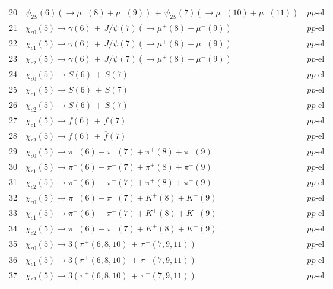 \documentclass{article}
\begin{document}
\begin{center}
\begin{tabular}{|c|l|l|}
20 & $\psi_{2S}(6)(\to \mu^+(8)+\mu^-(9))\,+\,\psi_{2S}(7)(\to \mu^+(10)+\mu^-(11))$ &  $pp$-el  \\

21 & $\chi_{c0}(5)\to \gamma(6)\,+\,J/\psi(7)(\to \mu^+(8)+\mu^-(9))$ &  $pp$-el  \\

22 & $\chi_{c1}(5)\to \gamma(6)\,+\,J/\psi(7)(\to \mu^+(8)+\mu^-(9))$ &  $pp$-el  \\

23 & $\chi_{c2}(5)\to \gamma(6)\,+\,J/\psi(7)(\to \mu^+(8)+\mu^-(9))$ &  $pp$-el  \\

24 & $\chi_{c0}(5)\to S(6)\,+\,S(7)$ &  $pp$-el  \\

25 & $\chi_{c1}(5)\to S(6)\,+\,S(7)$ &  $pp$-el  \\

26 & $\chi_{c2}(5)\to S(6)\,+\,S(7)$ &  $pp$-el  \\

27 & $\chi_{c1}(5)\to f(6)\,+\,\overline{f}(7)$ &  $pp$-el  \\

28 & $\chi_{c2}(5)\to f(6)\,+\,\overline{f}(7)$ &  $pp$-el  \\

29 & $\chi_{c0}(5)\to \pi^+(6)+\pi^-(7)+\pi^+(8)+\pi^-(9)$ &  $pp$-el  \\

30 & $\chi_{c1}(5)\to \pi^+(6)+\pi^-(7)+\pi^+(8)+\pi^-(9)$ &  $pp$-el  \\

31 & $\chi_{c2}(5)\to \pi^+(6)+\pi^-(7)+\pi^+(8)+\pi^-(9)$ &  $pp$-el  \\

32 & $\chi_{c0}(5)\to \pi^+(6)+\pi^-(7)+K^+(8)+K^-(9)$ &  $pp$-el  \\

33 & $\chi_{c1}(5)\to \pi^+(6)+\pi^-(7)+K^+(8)+K^-(9)$ &  $pp$-el  \\

34 & $\chi_{c2}(5)\to \pi^+(6)+\pi^-(7)+K^+(8)+K^-(9)$ &  $pp$-el  \\

35 & $\chi_{c0}(5)\to 3(\pi^+(6,8,10)\,+\,\pi^-(7,9,11))$ &  $pp$-el  \\

36 & $\chi_{c1}(5)\to 3(\pi^+(6,8,10)\,+\,\pi^-(7,9,11))$ &  $pp$-el  \\

37 & $\chi_{c2}(5)\to 3(\pi^+(6,8,10)\,+\,\pi^-(7,9,11))$ &  $pp$-el  \\


\end{tabular}
\end{center}
\end{document}
